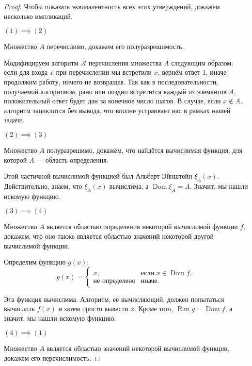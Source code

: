 \documentclass{article}
\begin{document}
    \begin{proof}
        Чтобы показать эквивалентность всех этих утверждений, докажем несколько импликаций.

        \((1) \implies (2)\)

        Множество \(A\) перечислимо, докажем его полуразрешимость.

        Модифицируем алгоритм \(\mathcal{A}\) перечисления множества \(A\) следующим образом: если для входа \(x\)
        при перечислении мы встретили \(x\), вернём ответ \(1\), иначе продолжим работу, ничего не возвращая.
        Так как в последовательности, получаемой алгоритмом, рано или поздно встретится каждый из
        элементов \(A\), положительный ответ будет дан за конечное число шагов. В случае, если \(x
        \not\in A\), алгоритм зациклится без вывода, что вполне устраивает нас в рамках нашей задачи.

        \((2) \implies (3)\)

        Множество \(A\) полуразрешимо, докажем, что найдётся вычислимая функция, для которой \(A\) ---
        область определения.

        Этой частичной вычислимой функцией был \sout{Альберт Эйнштейн} \(\xi_A(x)\). Действительно,
        знаем, что \(\xi_A(x)\) вычислима, а \(\operatorname{Dom} \xi_A = A\). Значит, мы
        нашли искомую функцию.

        \((3) \implies (4)\)

        Множество \(A\) является областью определения некоторой вычислимой функции \(f\), докажем, что
        оно также является областью значений некоторой другой вычислимой функции.

        Определим функцию \(g(x)\):
        \[
            g(x) =
            \begin{cases}
                x, & \text{если } x \in \operatorname{Dom} f,\\
                \text{не определено} & \text{иначе.}
            \end{cases}
        \]

        Эта функция вычислима. Алгоритм, её вычисляющий, должен попытаться вычислить \(f(x)\) и затем
        просто вывести \(x\). Кроме того, \(\operatorname{Ran} g = \operatorname{Dom} f\), а значит, мы
        нашли искомую функцию.

        \((4) \implies (1)\)

        Множество \(A\) является областью значений некоторой вычислимой функции, докажем его
        перечислимость.


\end{proof}
\end{document}

